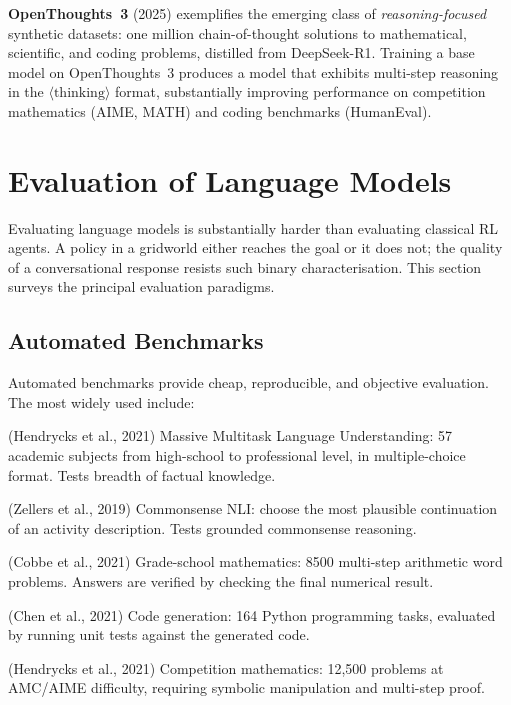 \textbf{OpenThoughts~3} (2025) exemplifies the emerging class of \emph{reasoning-focused} synthetic datasets: one million chain-of-thought solutions to mathematical, scientific, and coding problems, distilled from DeepSeek-R1. Training a base model on OpenThoughts~3 produces a model that exhibits multi-step reasoning in the $\langle\text{thinking}\rangle$ format, substantially improving performance on competition mathematics (AIME, MATH) and coding benchmarks (HumanEval).

\section{Evaluation of Language Models}
\label{sec:lm-eval}

Evaluating language models is substantially harder than evaluating classical RL agents. A policy in a gridworld either reaches the goal or it does not; the quality of a conversational response resists such binary characterisation. This section surveys the principal evaluation paradigms.

\subsection{Automated Benchmarks}

Automated benchmarks provide cheap, reproducible, and objective evaluation. The most widely used include:

\begin{description}[leftmargin=!, labelwidth=3.5cm]
  \item[MMLU] (Hendrycks et al., 2021) Massive Multitask Language Understanding: 57 academic subjects from high-school to professional level, in multiple-choice format. Tests breadth of factual knowledge.
  \item[HellaSwag] (Zellers et al., 2019) Commonsense NLI: choose the most plausible continuation of an activity description. Tests grounded commonsense reasoning.
  \item[GSM8K] (Cobbe et al., 2021) Grade-school mathematics: 8500 multi-step arithmetic word problems. Answers are verified by checking the final numerical result.
  \item[HumanEval] (Chen et al., 2021) Code generation: 164 Python programming tasks, evaluated by running unit tests against the generated code.
  \item[MATH] (Hendrycks et al., 2021) Competition mathematics: 12{,}500 problems at AMC/AIME difficulty, requiring symbolic manipulation and multi-step proof.
\end{description}

